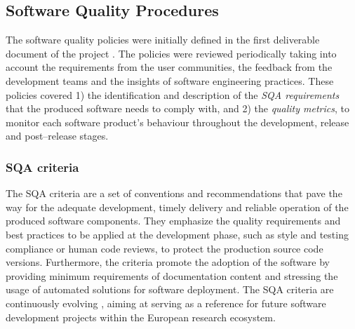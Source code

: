 \documentclass[journal]{IEEEtran}
\begin{document}
\subsection{Software Quality Procedures}
\label{subsec:sqa}

The software quality policies were initially defined in the first deliverable document of the
project \cite{indigo-d31}. The policies were reviewed periodically taking into account the requirements
from the user communities, the feedback from the development teams and the insights of software
engineering practices. These policies covered 1) the identification
and description of the \emph{SQA requirements} that the produced software needs
to comply with, and 2) the \emph{quality metrics}, to monitor each software product's
behaviour throughout the development, release and post--release stages.

\subsubsection{SQA criteria}

The SQA criteria are a set of conventions and recommendations that pave the way for
the adequate development, timely delivery and reliable operation of the produced software components.
They emphasize the quality requirements and best practices to be applied at the
development phase, such as style and testing compliance or human code reviews, to protect the
production source code versions. Furthermore, the criteria promote the adoption of the software
by providing minimum requirements of documentation content and stressing the usage of automated
solutions for software deployment. The SQA criteria are continuously evolving \cite{sqa-baseline}, aiming at serving
as a reference for future software development projects within the European research ecosystem.
\end{document}
